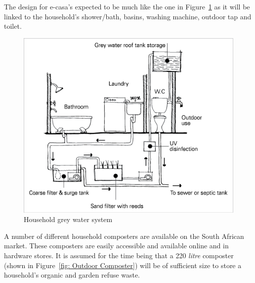 \documentclass[a4paper,11pt,fleqn]{report}
\begin{document}
The design for \ac{e-casa}'s expected to be much like the one in Figure~\ref{fig: Grey water system} as it will be linked to the household's shower/bath, basins, washing machine, outdoor tap and toilet.
%
\begin{figure}[h!]
\begin{center}
\includegraphics[scale = 1.2]{Household_Grey_Water.png}
\caption{Household grey water system}
\label{fig: Grey water system}
\end{center}
\end{figure}
%
A number of different household composters are available on the South African market. These composters are easily accessible and available online and in hardware stores. It is assumed for the time being that a 220 \textit{litre} composter (shown in Figure~\ref{fig: Outdoor Composter}) will be of sufficient size to store a household's organic and garden refuse waste.
%
\end{document}
